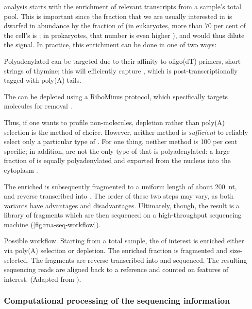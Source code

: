 \rnaseq analysis starts with the enrichment of relevant transcripts from a
sample’s total \rna pool. This is important since the \rna fraction that we are
usually interested in is dwarfed in abundance by the fraction of \rrna (in
eukaryotes, more than \num{70} per cent of the cell’s \rna is \rrna; in
prokaryotes, that number is even higher \citep{Davidson:1999}), and would
thus dilute the signal. In practice, this enrichment can be done in one of two
ways:
\begin{enumerate*}
    \item Polyadenylated \rna can be targeted due to their affinity to oligo(dT)
        primers, short strings of thymine; this will efficiently capture \mrna,
        which is post-transcriptionally \threep tagged with poly(A)
        tails.\todo[ref]{}
    \item The \rna can be \rrna depleted using a RiboMinus protocol, which
        specifically targets \rrna molecules for removal \citep{Cui:2010}.
\end{enumerate*}
Thus, if one wants to profile non-\mrna molecules, \rrna depletion rather than
poly(A) selection is the method of choice. However, neither method is
\emph{sufficient} to reliably select only a particular type of \rna. For one
thing, neither method is \num{100} per cent specific; in addition, \mrna[s] are
not the only type of \rna that is polyadenylated: a large fraction of \ncrna is
equally polyadenylated and exported from the nucleus into the cytoplasm
\citep{Cheng:2005}.

The enriched \rna is subsequently fragmented to a uniform length of about
\SI{200}{nt}, and reverse transcribed into \cdna. The order of these two steps
may vary, as both variants have advantages and disadvantages. Ultimately,
though, the result is a \cdna library of fragments which are then sequenced on a
high-throughput sequencing machine (\cref{fig:rna-seq-workflow}).

    {Possible \rnaseq workflow.}
    {Starting from a total \rna sample, the \rna of interest is enriched either
    via poly(A) selection or \rrna depletion. The enriched fraction is
    fragmented and size-selected. The fragments are reverse transcribed into
    \cdna and sequenced. The resulting sequencing reads are aligned back to a
    reference and counted on features of interest. (Adapted from
    \citet{Mortazavi:2008}).}

\subsubsection{Computational processing of the sequencing information}

